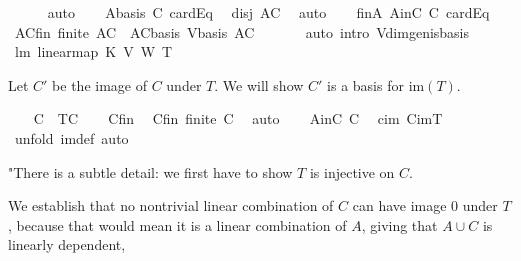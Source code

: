 \begin{isabellebody}
\ \ \ \ \isamarkupfalse%
\ auto\isanewline
\ \ \isamarkupfalse%
\ Abasis\ C\ cardEq\ \isamarkupfalse%
\ disj{\isacharcolon}\ {\isachardoublequoteopen}A{\isasyminter}C{\isacharequal}{\isacharbraceleft}{\isacharbraceright}{\isachardoublequoteclose}\ \isamarkupfalse%
\ auto\isanewline
\ \ \isamarkupfalse%
\ finA\ AinC\ C\ cardEq\ {}{}\ \isamarkupfalse%
\ ACfin{\isacharcolon}\ {\isachardoublequoteopen}finite\ {\isacharparenleft}A{\isasymunion}C{\isacharparenright}{\isachardoublequoteclose}\ \ ACbasis{\isacharcolon}\ {\isachardoublequoteopen}V{\isachardot}basis\ {\isacharparenleft}A{\isasymunion}C{\isacharparenright}{\isachardoublequoteclose}\ \isanewline
\ \ \ \ \isamarkupfalse%
\ {\isacharparenleft}auto\ intro{\isacharbang}{\isacharcolon}\ V{\isachardot}dim{\isacharunderscore}gen{\isacharunderscore}is{\isacharunderscore}basis{\isacharparenright}\ \isanewline
\ \ \isamarkupfalse%
\ lm{\isacharcolon}\ {\isachardoublequoteopen}linear{\isacharunderscore}map\ K\ V\ W\ T{\isachardoublequoteclose}\isacommand{{\isachardot}{\isachardot}}\isamarkupfalse%
%
\begin{isamarkuptxt}%
Let $C'$ be the image of $C$ under $T$. We will show $C'$ is a basis for $\text{im}(T)$.%
\end{isamarkuptxt}%
\isamarkuptrue%
\ \ \isamarkupfalse%
\ {\isacharquery}C{\isacharprime}\ {\isacharequal}\ {\isachardoublequoteopen}T{\isacharbackquote}C{\isachardoublequoteclose}\isanewline
\ \ \isamarkupfalse%
\ Cfin\ \isamarkupfalse%
\ C{\isacharprime}fin{\isacharcolon}\ {\isachardoublequoteopen}finite\ {\isacharquery}C{\isacharprime}{\isachardoublequoteclose}\ \isamarkupfalse%
\ auto\isanewline
\ \ \isamarkupfalse%
\ AinC\ C\ \isamarkupfalse%
\ cim{\isacharcolon}\ {\isachardoublequoteopen}{\isacharquery}C{\isacharprime}{\isasymsubseteq}imT{\isachardoublequoteclose}\ \isamarkupfalse%
\ {\isacharparenleft}unfold\ im{\isacharunderscore}def{\isacharcomma}\ auto{\isacharparenright}%
\begin{isamarkuptxt}%
"There is a subtle detail: we first have to show $T$ is injective on $C$.%
\end{isamarkuptxt}%
\isamarkuptrue%
%
\begin{isamarkuptxt}%
We establish that no nontrivial linear combination of $C$ can have image 0 under $T$, 
because that would mean it is a linear combination of $A$, giving that $A\cup C$ is linearly dependent, 

\end{isamarkuptxt}
\end{isabellebody}
